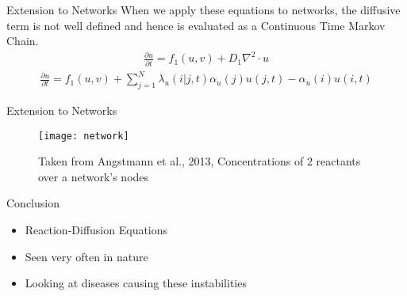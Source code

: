 \documentclass[pdf]{beamer}
\begin{document}
\begin{frame}{Extension to Networks}
When we apply these equations to networks, the diffusive term is not well defined and hence is evaluated as a Continuous Time Markov Chain.
\begin{align}
        \frac{\partial u}{\partial t} = f_1(u,v) +  D_1\nabla^2\cdot u
\end{align}
\begin{align}
        \frac{\partial u}{\partial t} = f_1(u,v) + \sum_{j=1}^N \lambda_u(i|j,t)\alpha_u(j)u(j,t) -\alpha_u(i)u(i,t)
\end{align}
\end{frame}

\begin{frame}{Extension to Networks}
\begin{figure}
\texttt{[image: network]}
\caption{Taken from Angstmann et al., 2013, Concentrations of 2 reactants over a network's nodes}
\end{figure}
\end{frame}

\begin{frame}{Conclusion}
	\begin{itemize}
		\item Reaction-Diffusion Equations
		\item Seen very often in nature
		\item Looking at diseases causing these instabilities
	\end{itemize}
\end{frame}
\end{document}
